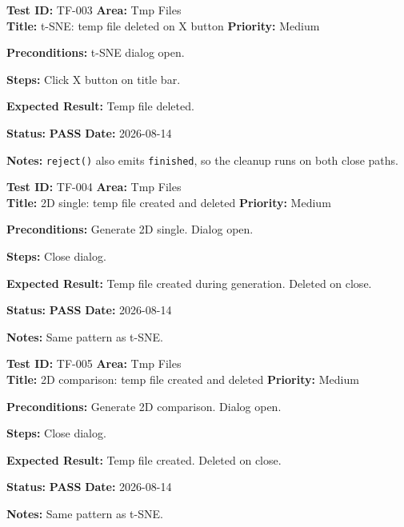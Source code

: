 \documentclass[12pt,a4paper]{article}
\newcommand{\pass}{\textcolor{paleogreen}{\textbf{PASS}}}
\newcommand{\testheader}[4]{%
  \smallskip
  \noindent\textbf{Test ID:} #1 \hfill \textbf{Area:} #2 \\
  \textbf{Title:} #3 \hfill \textbf{Priority:} #4
}
\newenvironment{testbody}{%
  \begin{description}[leftmargin=2em,style=nextline]
}{%
  \end{description}
  \smallskip
}
\begin{document}
\testheader{TF-003}{Tmp Files}{t-SNE: temp file deleted on X button}{Medium}
\begin{testbody}
  \item[\textbf{Preconditions:}] t-SNE dialog open.
  \item[\textbf{Steps:}] Click X button on title bar.
  \item[\textbf{Expected Result:}] Temp file deleted.
  \item[\textbf{Status:}] \pass{} \hspace{1em} \textbf{Date:} 2026-08-14
  \item[\textbf{Notes:}] \texttt{reject()} also emits \texttt{finished}, so the
        cleanup runs on both close paths.
\end{testbody}

\testheader{TF-004}{Tmp Files}{2D single: temp file created and deleted}{Medium}
\begin{testbody}
  \item[\textbf{Preconditions:}] Generate 2D single. Dialog open.
  \item[\textbf{Steps:}] Close dialog.
  \item[\textbf{Expected Result:}] Temp file created during generation. Deleted
        on close.
  \item[\textbf{Status:}] \pass{} \hspace{1em} \textbf{Date:} 2026-08-14
  \item[\textbf{Notes:}] Same pattern as t-SNE.
\end{testbody}

\testheader{TF-005}{Tmp Files}{2D comparison: temp file created and deleted}{Medium}
\begin{testbody}
  \item[\textbf{Preconditions:}] Generate 2D comparison. Dialog open.
  \item[\textbf{Steps:}] Close dialog.
  \item[\textbf{Expected Result:}] Temp file created. Deleted on close.
  \item[\textbf{Status:}] \pass{} \hspace{1em} \textbf{Date:} 2026-08-14
  \item[\textbf{Notes:}] Same pattern as t-SNE.
\end{testbody}
\end{document}
